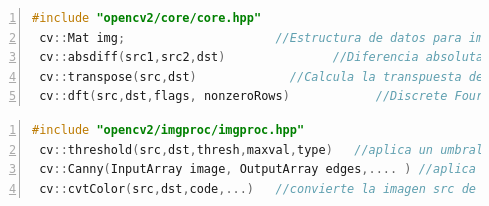 \documentclass[a4paper,10pt]{report}
\begin{document}
\begin{lstlisting}[caption={Módulo core},frame=bt,columns=fullflexible,numbers=left,backgroundcolor=\color{LemonChiffon1},basicstyle=\small,keywordstyle=\ttfamily\small,language=C++,stringstyle=\ttfamily,breaklines=true,xleftmargin=0.5em,xrightmargin=0pt,aboveskip=\bigskipamount,belowskip=\bigskipamount]
 #include "opencv2/core/core.hpp"
 cv::Mat img;				      //Estructura de datos para imagenes
 cv::absdiff(src1,src2,dst)  	          //Diferencia absoluta entre src1 y src2
 cv::transpose(src,dst)   	        //Calcula la transpuesta de la matriz src
 cv::dft(src,dst,flags, nonzeroRows)            //Discrete Fourier transformation
\end{lstlisting}



\begin{lstlisting}[caption={Módulo imgproc},frame=bt,columns=fullflexible,numbers=left,backgroundcolor=\color{LemonChiffon1},basicstyle=\small,keywordstyle=\ttfamily\small,language=C++,stringstyle=\ttfamily,breaklines=true,xleftmargin=0.5em,xrightmargin=0pt,aboveskip=\bigskipamount,belowskip=\bigskipamount]
 #include "opencv2/imgproc/imgproc.hpp" 
 cv::threshold(src,dst,thresh,maxval,type)   //aplica un umbral a los valores del input
 cv::Canny(InputArray image, OutputArray edges,.... ) //aplica el algoritmo de Canny para buscar bordes en la imagen
 cv::cvtColor(src,dst,code,...)   //convierte la imagen src de un espacio de colores a otro 
\end{lstlisting}

% 
%  
% 



\end{document}
